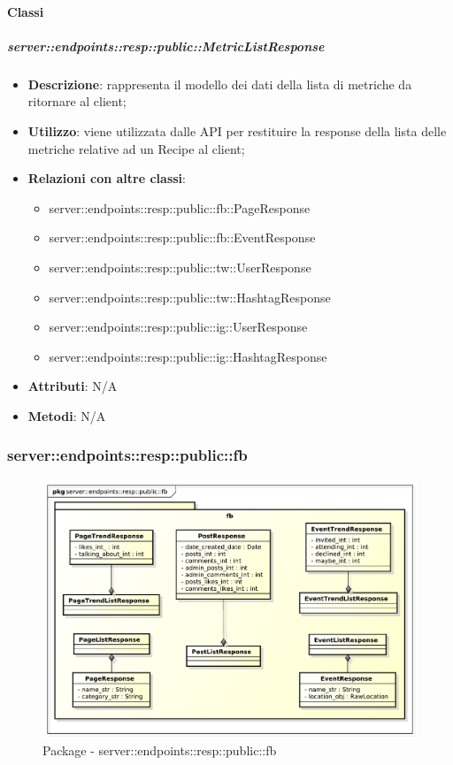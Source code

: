 	\paragraph{Classi} %

    \subparagraph{server::endpoints::resp::public::MetricListResponse} %
    \label{subp:bdsm_app_server_endpoints_resp_public_metriclistresponse}
    \begin{itemize}
      \item \textbf{Descrizione}: rappresenta il modello dei dati della lista di metriche da ritornare al client;
      \item \textbf{Utilizzo}: viene utilizzata dalle API per restituire la response della lista delle metriche relative ad un Recipe al client;
      \item \textbf{Relazioni con altre classi}:
        \begin{itemize}
          \item server::endpoints::resp::public::fb::PageResponse
          \item server::endpoints::resp::public::fb::EventResponse
          \item server::endpoints::resp::public::tw::UserResponse
          \item server::endpoints::resp::public::tw::HashtagResponse
          \item server::endpoints::resp::public::ig::UserResponse
          \item server::endpoints::resp::public::ig::HashtagResponse
        \end{itemize}
		\item \textbf{Attributi}: N/A
		\item \textbf{Metodi}: N/A
      \end{itemize}

\subsubsection{server::endpoints::resp::public::fb} %
\label{ssub:bdsm_app_server_endpoints_resp_public_fb}
\begin{figure}[!htbp]
	\centering
	\centerline{\includegraphics[scale=0.55]{./images/server/resp_fb.pdf}}
	\caption{Package - server::endpoints::resp::public::fb}
\end{figure}

